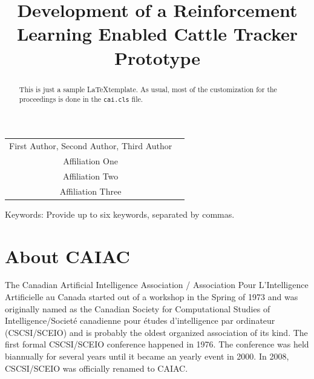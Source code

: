 \documentclass[10pt]{cai}
\begin{document}
\def\conferenceyear{2025}
\begin{center}

\title{Development of a Reinforcement Learning Enabled Cattle Tracker Prototype}
\maketitle

\thispagestyle{empty}

\begin{tabular}{cc}
First Author\upstairs{\affilone,*}, Second Author\upstairs{\affilone}, Third Author\upstairs{\affilthree}
\\[0.25ex]
{\small \upstairs{\affilone} Affiliation One} \\
{\small \upstairs{\affiltwo} Affiliation Two} \\
{\small \upstairs{\affilthree} Affiliation Three} \\
\end{tabular}
  
\vspace*{0.2in}
\end{center}

\begin{abstract}
This is just a sample \LaTeX template. As usual, most of the customization for the proceedings is done in the \texttt{cai.cls} file. 
\end{abstract}

\begin{keywords}{Keywords:}
Provide up to six keywords, separated by commas.
\end{keywords}
\copyrightnotice

\section{About CAIAC}

The Canadian Artificial Intelligence Association / Association Pour L'Intelligence Artificielle au Canada started out of a workshop in the Spring of 1973 and was originally named as the Canadian Society for Computational Studies of Intelligence/Societé canadienne pour études d'intelligence par ordinateur (CSCSI/SCEIO) and is probably the oldest organized association of its kind. The first formal CSCSI/SCEIO conference happened in 1976. The conference was held biannually for several years until it became an yearly event in 2000. In 2008, CSCSI/SCEIO was officially renamed to CAIAC.
\end{document}
